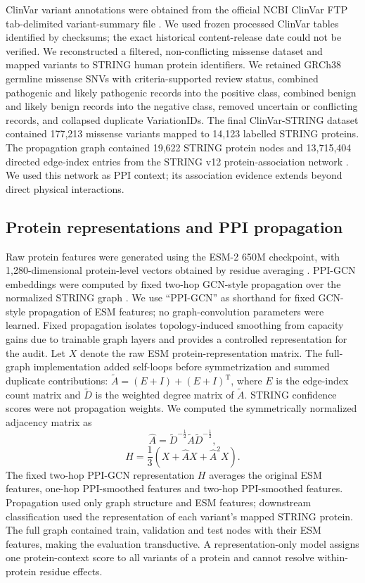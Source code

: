 \documentclass[conference]{IEEEtran}
\begin{document}
ClinVar variant annotations were obtained from the official NCBI ClinVar FTP tab-delimited variant-summary file \cite{Landrum2020ClinVar}. We used frozen processed ClinVar tables identified by checksums; the exact historical content-release date could not be verified. We reconstructed a filtered, non-conflicting missense dataset and mapped variants to STRING human protein identifiers. We retained GRCh38 germline missense SNVs with criteria-supported review status, combined pathogenic and likely pathogenic records into the positive class, combined benign and likely benign records into the negative class, removed uncertain or conflicting records, and collapsed duplicate VariationIDs. The final ClinVar-STRING dataset contained 177,213 missense variants mapped to 14,123 labelled STRING proteins. The propagation graph contained 19,622 STRING protein nodes and 13,715,404 directed edge-index entries from the STRING v12 protein-association network \cite{Szklarczyk2023STRING}. We used this network as PPI context; its association evidence extends beyond direct physical interactions.

\subsection{Protein representations and PPI propagation}

Raw protein features were generated using the ESM-2 650M checkpoint, with 1,280-dimensional protein-level vectors obtained by residue averaging \cite{Lin2023ESM}. PPI-GCN embeddings were computed by fixed two-hop GCN-style propagation over the normalized STRING graph \cite{Kipf2017GCN}. We use ``PPI-GCN'' as shorthand for fixed GCN-style propagation of ESM features; no graph-convolution parameters were learned. Fixed propagation isolates topology-induced smoothing from capacity gains due to trainable graph layers and provides a controlled representation for the audit. Let $X$ denote the raw ESM protein-representation matrix. The full-graph implementation added self-loops before symmetrization and summed duplicate contributions: $\tilde{A}=(E+I)+(E+I)^{\mathrm{T}}$, where $E$ is the edge-index count matrix and $\tilde{D}$ is the weighted degree matrix of $\tilde{A}$. STRING confidence scores were not propagation weights. We computed the symmetrically normalized adjacency matrix as
\begin{equation}
\hat{A}=\tilde{D}^{-\frac{1}{2}}\tilde{A}\tilde{D}^{-\frac{1}{2}},
\end{equation}
\begin{equation}
H=\frac{1}{3}\left(X+\hat{A}X+\hat{A}^{2}X\right).
\end{equation}
The fixed two-hop PPI-GCN representation $H$ averages the original ESM features, one-hop PPI-smoothed features and two-hop PPI-smoothed features. Propagation used only graph structure and ESM features; downstream classification used the representation of each variant's mapped STRING protein. The full graph contained train, validation and test nodes with their ESM features, making the evaluation transductive. A representation-only model assigns one protein-context score to all variants of a protein and cannot resolve within-protein residue effects.
\end{document}
